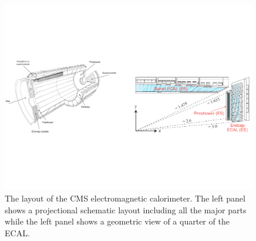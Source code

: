 \begin{figure}
 \centering
\includegraphics[width=0.99\textwidth]{CMS_DetectorFigures/ECAL_Geometry.pdf}
\caption{The layout of the CMS electromagnetic calorimeter. The left
  panel shows a projectional schematic
layout including all the major parts while the left panel shows a
geometric view of a quarter of the ECAL.\label{fig:ECALgeometry}}
\end{figure}

